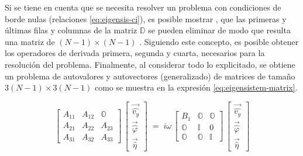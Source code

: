 Si se tiene en cuenta que se necesita resolver un problema con condiciones de borde nulas (relaciones  \ref{eq:eigensis-ci}), es posible mostrar \cite{szuban2023}, que las primeras y últimas filas y columnas de la matriz $\mathbb{D}$ se pueden eliminar  de modo que resulta una matriz de $(N-1) \times (N-1)$ . Siguiendo este concepto, es posible obtener los operadores de derivada primera, segunda y cuarta, necesarios para la resolución del problema. Finalmente, al considerar todo lo explicitado, se obtiene un problema de autovalores y autovectores (generalizado) de matrices de tamaño  $3(N-1) \times 3(N-1)$ como se muestra en la expresión \ref{eq:eigensistem-matrix}. 

\begin{equation}
\begin{bmatrix}
A_{11} & A_{12} & \mathbb{O} \\[4pt]
A_{21} & A_{22} & A_{23} \\[4pt]
A_{31} & A_{32} & A_{33}
\end{bmatrix}
\,\begin{bmatrix}
\vec{\widehat{v_y} } \\[4pt]
\vec{\widehat{\varphi}} \\[4pt]
\vec{\widehat{\eta}}
\end{bmatrix}
\;=\; i \omega
\,\begin{bmatrix}
  B_1 & \mathbb{O} & \mathbb{O} \\[4pt]
    \mathbb{O} & \mathbb{I} & 0 \\[4pt]
    \mathbb{O} & \mathbb{O} & \mathbb{I}
\end{bmatrix}
\,\begin{bmatrix}
\vec{\widehat{v_y}} \\[4pt]
\vec{\widehat{\varphi}} \\[4pt]
\vec{\widehat{\eta}}
\end{bmatrix}
\label{eq:eigensistem-matrix}
\end{equation}

